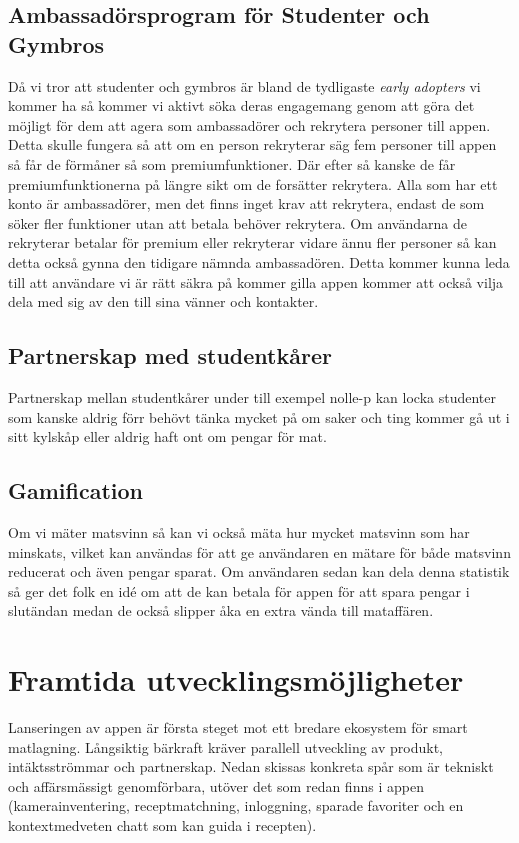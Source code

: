 \documentclass[a4paper,12pt]{article}
\begin{document}
\subsection{Ambassadörsprogram för Studenter och Gymbros} 
Då vi tror att studenter och gymbros är bland de tydligaste \textit{early adopters} vi kommer ha så kommer vi aktivt söka deras engagemang genom att göra det möjligt för dem att agera som ambassadörer och rekrytera personer till appen. Detta skulle fungera så att om en person rekryterar säg fem personer till appen så får de förmåner så som premiumfunktioner. Där efter så kanske de får premiumfunktionerna på längre sikt om de forsätter rekrytera. Alla som har ett konto är ambassadörer, men det finns inget krav att rekrytera, endast de som söker fler funktioner utan att betala behöver rekrytera. Om användarna de rekryterar betalar för premium eller rekryterar vidare ännu fler personer så kan detta också gynna den tidigare nämnda ambassadören. Detta kommer kunna leda till att användare vi är rätt säkra på kommer gilla appen kommer att också vilja dela med sig av den till sina vänner och kontakter.

\subsection{Partnerskap med studentkårer}
Partnerskap mellan studentkårer under till exempel nolle-p kan locka studenter som kanske aldrig förr behövt tänka mycket på om saker och ting kommer gå ut i sitt kylskåp eller aldrig haft ont om pengar för mat. 

\subsection{Gamification}
Om vi mäter matsvinn så kan vi också mäta hur mycket matsvinn som har minskats, vilket kan användas för att ge användaren en mätare för både matsvinn reducerat och även pengar sparat. Om användaren sedan kan dela denna statistik så ger det folk en idé om att de kan betala för appen för att spara pengar i slutändan medan de också slipper åka en extra vända till mataffären. 




\section{Framtida utvecklingsmöjligheter}
Lanseringen av appen är första steget mot ett bredare ekosystem för smart matlagning. Långsiktig bärkraft kräver parallell utveckling av produkt, intäktsströmmar och partnerskap. Nedan skissas konkreta spår som är tekniskt och affärsmässigt genomförbara, utöver det som redan finns i appen (kamerainventering, receptmatchning, inloggning, sparade favoriter och en kontextmedveten chatt som kan guida i recepten).
\end{document}
